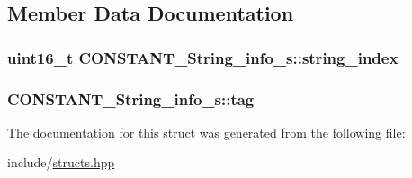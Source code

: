 \subsection{Member Data Documentation}
\hypertarget{structCONSTANT__String__info__s_a9fb8030b5c3bbfca53934e67991399cf}{
\subsubsection[{string\+\_\+index}]{\setlength{\rightskip}{0pt plus 5cm}uint16\+\_\+t C\+O\+N\+S\+T\+A\+N\+T\+\_\+\+String\+\_\+info\+\_\+s\+::string\+\_\+index}}\label{structCONSTANT__String__info__s_a9fb8030b5c3bbfca53934e67991399cf}
\hypertarget{structCONSTANT__String__info__s_a63a92aabe2638ad427f912551c99c18a}{
\subsubsection[{tag}]{ C\+O\+N\+S\+T\+A\+N\+T\+\_\+\+String\+\_\+info\+\_\+s\+::tag}}\label{structCONSTANT__String__info__s_a63a92aabe2638ad427f912551c99c18a}


The documentation for this struct was generated from the following file\+:\begin{DoxyCompactItemize}
\item 
include/\hyperlink{structs_8hpp}{structs.\+hpp}\end{DoxyCompactItemize}
